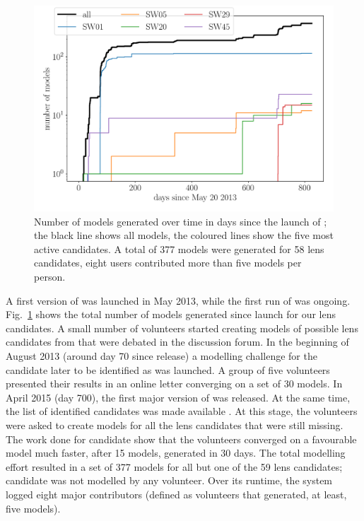 \begin{figure}
  \includegraphics[width=\linewidth]{img/timelapse3}
  \caption{ Number of models generated over time in days since the
    launch of \SpL; the black line shows all models, the coloured
    lines show the five most active candidates. A total of 377 models
    were generated for 58 lens candidates, eight users contributed
    more than five models per person. }
  \label{fig:time}
\end{figure}


A first version of \SpL was launched in May 2013, while
the first run of \SW was ongoing.  Fig.~\ref{fig:time} shows the
total number of models generated since launch for our lens candidates.
A small number of volunteers started creating models of possible lens
candidates from \SW that were debated in the discussion forum.  In the
beginning of August 2013 (around day 70 since release) a modelling
challenge for the candidate later to be identified as  was
launched.  A group of five volunteers presented their results in an
online letter
converging on a set of 30 models. In April 2015 (day 700),
the first major version of \SpL was released. At the same time,
the list of identified candidates was made available \citep[as a preprint
  of][]{2016MNRAS.455.1191M}.  At this stage, the volunteers were
asked to create models for all the lens candidates that were still
missing.  The work done for candidate  show that the
volunteers converged on a favourable model much faster, after 15
models, generated in 30 days.  The total modelling effort resulted in
a set of 377 \SpL models for all but one of the 59 \SW lens
candidates; candidate  was not modelled by any volunteer.  Over
its runtime, the system logged eight major contributors (defined as
volunteers that generated, at least, five models).

